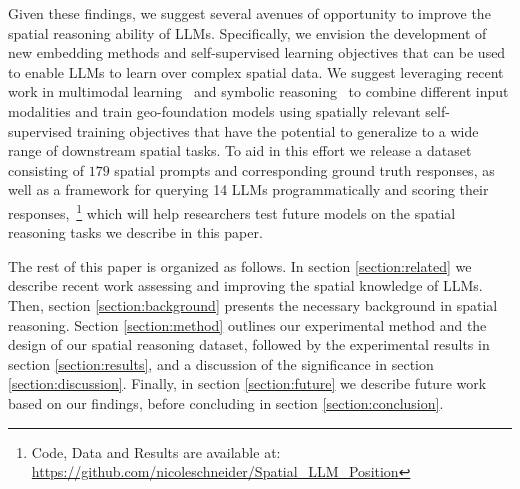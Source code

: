 Given these findings, we suggest several avenues of opportunity to improve the spatial reasoning ability of LLMs.
Specifically, we envision the development of new embedding methods and self-supervised learning objectives that can be used to enable LLMs to learn over complex spatial data.
We suggest leveraging recent work in multimodal learning~\cite{Xue2023, Trappolini2023} and symbolic reasoning~\cite{Lee2023} to combine different input modalities and train geo-foundation models using spatially relevant self-supervised training objectives that have the potential to generalize to a wide range of downstream spatial tasks.
To aid in this effort we release a dataset consisting of $179$ spatial prompts and corresponding ground truth responses, as well as a framework for querying 14 LLMs programmatically and scoring their responses,~\footnote{Code, Data and Results are available at: \url{https://github.com/nicoleschneider/Spatial_LLM_Position}} which will help researchers test future models on the spatial reasoning tasks we describe in this paper. 



The rest of this paper is organized as follows.
In section \ref{section:related} we describe recent work assessing and improving the spatial knowledge of LLMs.
Then, section \ref{section:background} presents the necessary background in spatial reasoning.
Section \ref{section:method} outlines our experimental method and the design of our spatial reasoning dataset, followed by the experimental results in section \ref{section:results}, and a discussion of the significance in section \ref{section:discussion}.
Finally, in section \ref{section:future} we describe future work based on our findings, before concluding in section \ref{section:conclusion}. 
